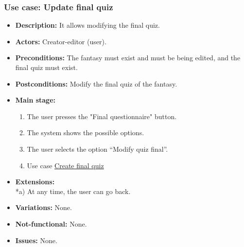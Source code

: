 \subsubsection{Use case: Update final quiz}
\begin{itemize}
	\item \textbf{Description:} It allows modifying the final quiz.
	\item \textbf{Actors:} Creator-editor (user).
	\item \textbf{Preconditions:} The fantasy must exist and must be being edited, and the final quiz must exist.
	\item \textbf{Postconditions:} Modify the final quiz of the fantasy.
	\item \textbf{Main stage:}
	\begin{enumerate}
		\item The user presses the "Final questionnaire" button.
		\item The system shows the possible options.
		\item The user selects the option ``Modify quiz final''.
		\item Use case \hyperlink{crearquizfinal}{Create final quiz}
	\end{enumerate}
	\item \textbf{Extensions:} \\ *a) At any time, the user can go back.
	\item \textbf{Variations:} None.
	\item \textbf{Not-functional:} None.
	\item \textbf{Issues:} None.
\end{itemize}

